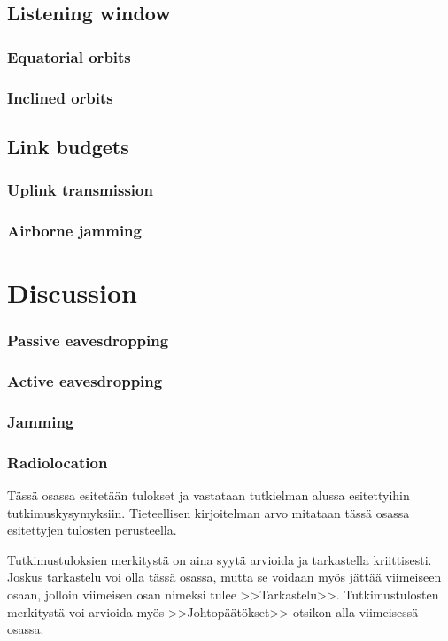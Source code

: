 \documentclass[english, 12pt, a4paper, elec, utf8, a-1b, online]{aaltothesis}
\begin{document}
\subsection{Listening window}

\subsubsection{Equatorial orbits}

\subsubsection{Inclined orbits}


\subsection{Link budgets}
\subsubsection{Uplink transmission}
\subsubsection{Airborne jamming}

\section{Discussion}
\subsubsection{Passive eavesdropping}
\subsubsection{Active eavesdropping}
\subsubsection{Jamming}
\subsubsection{Radiolocation}


T\"ass\"a osassa esitet\"a\"an tulokset ja vastataan tutkielman alussa
esitettyihin tutkimuskysymyksiin.
Tieteellisen kirjoitelman
arvo mitataan t\"ass\"a osassa esitettyjen tulosten perusteella.

Tutkimustuloksien merkityst\"a on aina syyt\"a arvioida ja tarkastella
kriittisesti.  Joskus tarkastelu voi olla t\"ass\"a osassa, mutta se
voidaan my\"os j\"att\"a\"a viimeiseen osaan, jolloin viimeisen osan nimeksi
tulee >>Tarkastelu>>. Tutkimustulosten merkityst\"a voi arvioida my\"os
>>Johtop\"a\"at\"okset>>-otsikon alla viimeisess\"a osassa.
\end{document}
